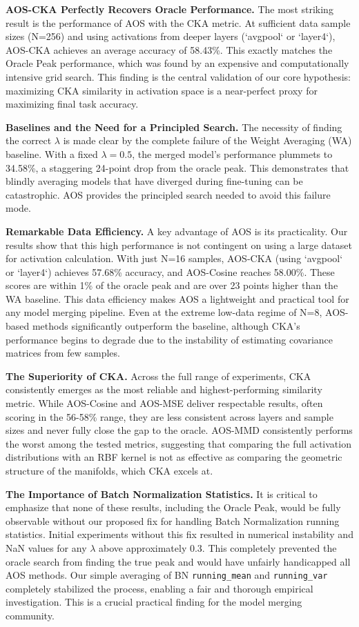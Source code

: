 \documentclass{article}
\theoremstyle{plain}
\theoremstyle{definition}
\theoremstyle{remark}
\begin{document}
\textbf{AOS-CKA Perfectly Recovers Oracle Performance.} The most striking result is the performance of AOS with the CKA metric. At sufficient data sample sizes (N=256) and using activations from deeper layers (`avgpool` or `layer4`), AOS-CKA achieves an average accuracy of 58.43\%. This exactly matches the Oracle Peak performance, which was found by an expensive and computationally intensive grid search. This finding is the central validation of our core hypothesis: maximizing CKA similarity in activation space is a near-perfect proxy for maximizing final task accuracy.

\textbf{Baselines and the Need for a Principled Search.} The necessity of finding the correct $\lambda$ is made clear by the complete failure of the Weight Averaging (WA) baseline. With a fixed $\lambda=0.5$, the merged model's performance plummets to 34.58\%, a staggering 24-point drop from the oracle peak. This demonstrates that blindly averaging models that have diverged during fine-tuning can be catastrophic. AOS provides the principled search needed to avoid this failure mode.

\textbf{Remarkable Data Efficiency.} A key advantage of AOS is its practicality. Our results show that this high performance is not contingent on using a large dataset for activation calculation. With just N=16 samples, AOS-CKA (using `avgpool` or `layer4`) achieves 57.68\% accuracy, and AOS-Cosine reaches 58.00\%. These scores are within 1\% of the oracle peak and are over 23 points higher than the WA baseline. This data efficiency makes AOS a lightweight and practical tool for any model merging pipeline. Even at the extreme low-data regime of N=8, AOS-based methods significantly outperform the baseline, although CKA's performance begins to degrade due to the instability of estimating covariance matrices from few samples.

\textbf{The Superiority of CKA.} Across the full range of experiments, CKA consistently emerges as the most reliable and highest-performing similarity metric. While AOS-Cosine and AOS-MSE deliver respectable results, often scoring in the 56-58\% range, they are less consistent across layers and sample sizes and never fully close the gap to the oracle. AOS-MMD consistently performs the worst among the tested metrics, suggesting that comparing the full activation distributions with an RBF kernel is not as effective as comparing the geometric structure of the manifolds, which CKA excels at.

\textbf{The Importance of Batch Normalization Statistics.} It is critical to emphasize that none of these results, including the Oracle Peak, would be fully observable without our proposed fix for handling Batch Normalization running statistics. Initial experiments without this fix resulted in numerical instability and NaN values for any $\lambda$ above approximately 0.3. This completely prevented the oracle search from finding the true peak and would have unfairly handicapped all AOS methods. Our simple averaging of BN \texttt{running\_mean} and \texttt{running\_var} completely stabilized the process, enabling a fair and thorough empirical investigation. This is a crucial practical finding for the model merging community.
\end{document}
